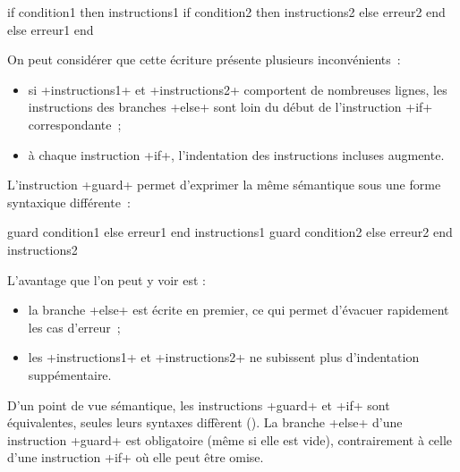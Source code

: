 \begin{galgas4box}
if condition1 then
  instructions1
  if condition2 then
    instructions2
  else
    erreur2
  end
else
  erreur1
end
\end{galgas4box}

On peut considérer que cette écriture présente plusieurs inconvénients~:
\begin{itemize}
  \item si \ggsq+instructions1+ et \ggsq+instructions2+ comportent de nombreuses lignes, les instructions des branches \ggsq+else+ sont loin du début de l'instruction \ggsq+if+ correspondante~;
  \item à chaque instruction \ggsq+if+, l'indentation des instructions incluses augmente.
\end{itemize}

L'instruction \ggsq+guard+ permet d'exprimer la même sémantique sous une forme syntaxique différente~:

\begin{galgas4box}
guard condition1 else
  erreur1
end
instructions1
guard condition2 else
  erreur2
end
instructions2
\end{galgas4box}

L'avantage que l'on peut y voir est :
\begin{itemize}
  \item la branche \ggsq+else+ est écrite en premier, ce qui permet d'évacuer rapidement les cas d'erreur~;
  \item les \ggsq+instructions1+ et \ggsq+instructions2+ ne subissent plus d'indentation suppémentaire.
\end{itemize}

D'un point de vue sémantique, les instructions \ggsq+guard+ et \ggsq+if+ sont équivalentes, seules leurs syntaxes diffèrent (). La branche \ggsq+else+ d'une instruction \ggsq+guard+ est obligatoire (même si elle est vide), contrairement à celle d'une instruction \ggsq+if+ où elle peut être omise.


